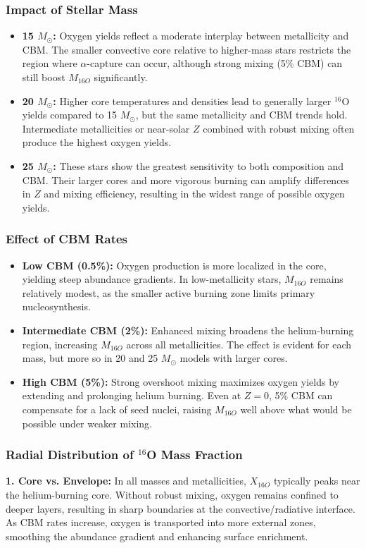 \subsubsection{Impact of Stellar Mass}
\begin{itemize}
    \item \textbf{15 $M_\odot$:}
    Oxygen yields reflect a moderate interplay between metallicity and CBM. The smaller convective core relative to higher-mass stars restricts the region where $\alpha$-capture can occur, although strong mixing (5\% CBM) can still boost $M_{16O}$ significantly.
    \item \textbf{20 $M_\odot$:}
    Higher core temperatures and densities lead to generally larger $^{16}$O yields compared to 15 $M_\odot$, but the same metallicity and CBM trends hold. Intermediate metallicities or near-solar $Z$ combined with robust mixing often produce the highest oxygen yields.
    \item \textbf{25 $M_\odot$:}
    These stars show the greatest sensitivity to both composition and CBM. Their larger cores and more vigorous burning can amplify differences in $Z$ and mixing efficiency, resulting in the widest range of possible oxygen yields.
\end{itemize}

\subsubsection{Effect of CBM Rates}
\begin{itemize}
    \item \textbf{Low CBM (0.5\%):}
    Oxygen production is more localized in the core, yielding steep abundance gradients. In low-metallicity stars, $M_{16O}$ remains relatively modest, as the smaller active burning zone limits primary nucleosynthesis.
    \item \textbf{Intermediate CBM (2\%):}
    Enhanced mixing broadens the helium-burning region, increasing $M_{16O}$ across all metallicities. The effect is evident for each mass, but more so in 20 and 25 $M_\odot$ models with larger cores.
    \item \textbf{High CBM (5\%):}
    Strong overshoot mixing maximizes oxygen yields by extending and prolonging helium burning. Even at $Z=0$, 5\% CBM can compensate for a lack of seed nuclei, raising $M_{16O}$ well above what would be possible under weaker mixing.
\end{itemize}

\subsubsection{Radial Distribution of $^{16}$O Mass Fraction}
\textbf{1. Core vs. Envelope:}  
In all masses and metallicities, $X_{16O}$ typically peaks near the helium-burning core. Without robust mixing, oxygen remains confined to deeper layers, resulting in sharp boundaries at the convective/radiative interface. As CBM rates increase, oxygen is transported into more external zones, smoothing the abundance gradient and enhancing surface enrichment.

